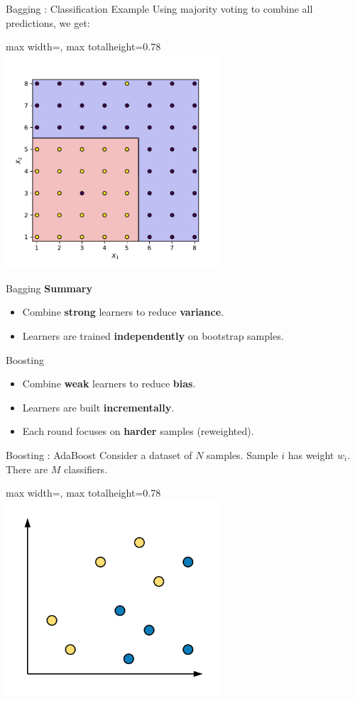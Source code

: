 \documentclass[aspectratio=169,10pt]{beamer}
\newcommand{\fitpic}[1]{\begin{adjustbox}{max width=\linewidth, max totalheight=0.78\textheight}#1\end{adjustbox}}
\begin{document}
\begin{frame}{Bagging : Classification Example}
  Using majority voting to combine all predictions, we get:\\[0.3cm]
  \centering
  \fitpic{\includegraphics[width=0.6\textwidth]{../assets/ensemble/figures/decision-boundary-ensemble}}
\end{frame}

\begin{frame}{Bagging}
  \textbf{Summary}
  \begin{itemize}
    \item Combine \textbf{strong} learners to reduce \textbf{variance}.
    \item Learners are trained \textbf{independently} on bootstrap samples.
  \end{itemize}
\end{frame}

\begin{frame}{Boosting}
  \begin{itemize}
    \item Combine \textbf{weak} learners to reduce \textbf{bias}.
    \pause \item Learners are built \textbf{incrementally}.
    \pause \item Each round focuses on \textbf{harder} samples (reweighted).
  \end{itemize}
\end{frame}

\begin{frame}{Boosting : AdaBoost }
  Consider a dataset of $N$ samples. Sample $i$ has weight $w_i$. There are $M$ classifiers.\\[0.3cm]
  \centering
  \fitpic{\includegraphics[width=0.6\textwidth]{../assets/ensemble/diagrams/ada_data}}
\end{frame}
\end{document}
